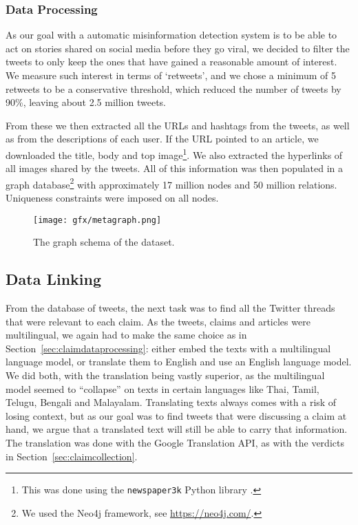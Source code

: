 \documentclass[sigconf,natbib=true,anonymous=false,nonacm]{acmart}
\begin{document}
\subsubsection{Data Processing}
\label{sec:twitterdataprocessing}
As our goal with a automatic misinformation detection system is to be able to
act on stories shared on social media before they go viral, we decided to
filter the tweets to only keep the ones that have gained a reasonable amount of
interest. We measure such interest in terms of `retweets', and we chose a
minimum of 5 retweets to be a conservative threshold, which reduced the number
of tweets by 90\%, leaving about 2.5 million tweets.

From these we then extracted all the URLs and hashtags from the tweets, as well
as from the descriptions of each user. If the URL pointed to an article, we
downloaded the title, body and top image\footnote{This was done using the
\texttt{newspaper3k} Python library \citep{ouyang2013newspaper3k}.}. We also
extracted the hyperlinks of all images shared by the tweets. All of this
information was then populated in a graph database\footnote{We used the Neo4j
framework, see \url{https://neo4j.com/}.} with approximately 17 million nodes
and 50 million relations. Uniqueness constraints were imposed on all nodes.

\begin{figure*}
    \begin{center}
        \texttt{[image: gfx/metagraph.png]}
    \end{center}
    \caption{The graph schema of the \datasetname dataset.}
    \label{fig:metagraph}
\end{figure*}

\subsection{Data Linking}
\label{sec:datalinking}
From the database of tweets, the next task was to find all the Twitter threads
that were relevant to each claim.
As the tweets, claims and articles were multilingual, we again had to make the
same choice as in Section~\ref{sec:claimdataprocessing}: either embed the texts
with a multilingual language model, or translate them to English and use an
English language model. We did both, with the translation being vastly
superior, as the multilingual model seemed to ``collapse'' on texts in certain
languages like Thai, Tamil, Telugu, Bengali and Malayalam. Translating texts
always comes with a risk of losing context, but as our goal was to find tweets
that were discussing a claim at hand, we argue that a translated text will
still be able to carry that information. The translation was done with the
Google Translation API, as with the verdicts in
Section~\ref{sec:claimcollection}.
\end{document}
